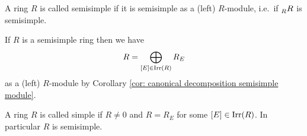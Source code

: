 \begin{defi}
 A ring $R$ is called semisimple if it is semisimple as a (left) $R$-module, i.e.\ if $\prescript{}{R}{R}$ is semisimple.
\end{defi}


If $R$ is a semisimple ring then we have
\[
 R = \bigoplus_{[E] \in \operatorname{Irr}(R)} R_E
\]
as a (left) $R$-module by Corollary \ref{cor: canonical decomposition semisimple module}.


\begin{defi}
 A ring $R$ is called simple if $R \neq 0$ and $R = R_E$ for some \mbox{$[E] \in \operatorname{Irr}(R)$}. In particular $R$ is semisimple.
\end{defi}
























